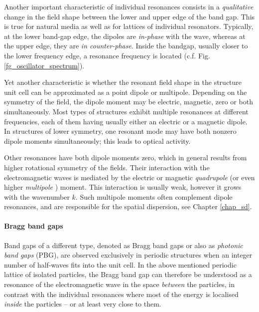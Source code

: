 Another important characteristic of individual resonances consists in a \textit{qualitative} change in the field shape between the lower and upper edge of the band gap. This is true for natural media as well as for lattices of individual resonators. Typically, at the lower band-gap edge, the dipoles are \textit{in-phase} with the wave, whereas at the upper edge, they are \textit{in counter-phase}.  %
Inside the bandgap, usually closer to the lower frequency edge, a resonance frequency is located (c.f. Fig. \ref{fg_oscillator_spectrum}).

Yet another characteristic is whether the resonant field shape in the structure unit cell can be approximated as a point dipole or multipole. Depending on the symmetry of the field, the dipole moment may be electric, magnetic, zero or both simultaneously. Most types of structures exhibit multiple resonances at different frequencies, each of them having usually either an electric or a magnetic dipole. In structures of lower symmetry, one resonant mode may have both nonzero dipole moments simultaneously; this leads to optical activity. 

Other resonances have both dipole moments zero, which in general results from higher rotational symmetry of the fields. Their interaction with the electromagnetic waves is mediated by the electric or magnetic \textit{quadrupole} (or even higher \textit{multipole} \cite{merlin2009metamaterials}) moment. This interaction is usually weak, however it grows with the wavenumber $k$. Such multipole moments often complement dipole resonances, and are responsible for the spatial dispersion, see Chapter \ref{chap_sd}. %

\paragraph{Bragg band gaps}%
Band gaps of a different type, denoted as Bragg band gaps or also as \textit{photonic band gaps} (PBG), are observed exclusively in periodic structures when an integer number of half-waves fits into the unit cell. 
In the above mentioned periodic lattice of isolated particles, the Bragg band gap can therefore be understood as a resonance of the electromagnetic wave in the space \textit{between} the particles, in contrast with the individual resonances where most of the energy is localised \textit{inside} the particles -- or at least very close to them.


